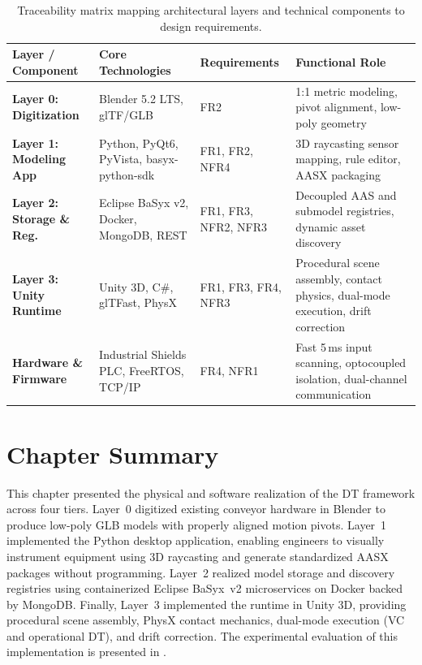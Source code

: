 \begin{table}[htbp]
    \centering
    \caption{Traceability matrix mapping architectural layers and technical components to design requirements.}
    \label{tab:impl_traceability_matrix}
    \small
    \renewcommand{\arraystretch}{1.3}
    \begin{tabularx}{\textwidth}{@{}p{3.0cm} p{3.4cm} p{1.9cm} X@{}}
        \toprule
        \textbf{Layer / Component} & \textbf{Core Technologies} & \textbf{Requirements} & \textbf{Functional Role} \\ \midrule
        \textbf{Layer 0: Digitization} & Blender 5.2 LTS, \gls{glTF}/\gls{GLB} & FR2 & 1:1 metric modeling, pivot alignment, low-poly geometry \\
        \textbf{Layer 1: Modeling App} & Python, PyQt6, PyVista, basyx-python-sdk & FR1, FR2, NFR4 & 3D raycasting sensor mapping, rule editor, \gls{AASX} packaging \\
        \textbf{Layer 2: Storage \& Reg.} & Eclipse BaSyx v2, Docker, MongoDB, \gls{REST} & FR1, FR3, NFR2, NFR3 & Decoupled \gls{AAS} and submodel registries, dynamic asset discovery \\
        \textbf{Layer 3: Unity Runtime} & Unity 3D, C\#, glTFast, PhysX & FR1, FR3, FR4, NFR3 & Procedural scene assembly, contact physics, dual-mode execution, drift correction \\
        \textbf{Hardware \& Firmware} & Industrial Shields \gls{PLC}, FreeRTOS, \gls{TCP}/\gls{IP} & FR4, NFR1 & Fast 5\,ms input scanning, optocoupled isolation, dual-channel communication \\ \bottomrule
    \end{tabularx}
\end{table}

\section{Chapter Summary}
\label{sec:impl_summary}

This chapter presented the physical and software realization of the \gls{DT} framework across four tiers. Layer~0 digitized existing conveyor hardware in Blender to produce low-poly \gls{GLB} models with properly aligned motion pivots. Layer~1 implemented the Python desktop application, enabling engineers to visually instrument equipment using 3D raycasting and generate standardized \gls{AASX} packages without programming. Layer~2 realized model storage and discovery registries using containerized Eclipse BaSyx~v2 microservices on Docker backed by MongoDB. Finally, Layer~3 implemented the runtime in Unity 3D, providing procedural scene assembly, PhysX contact mechanics, dual-mode execution (\gls{VC} and operational \gls{DT}), and drift correction. The experimental evaluation of this implementation is presented in .

